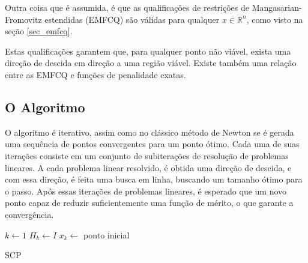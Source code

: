 Outra coisa que é assumida, é que as qualificações de restrições de Mangasarian-Fromovitz estendidas (EMFCQ)
\cite{di1994exact} são válidas para qualquer \( x \in \mathbb{R}^n \), como visto na seção \ref{sec_emfcq}.

%
Estas qualificações garantem que, para qualquer ponto não viável, exista uma
direção de descida em direção a uma região viável. Existe também uma relação entre as EMFCQ
e funções de penalidade exatas.


\subsection{O Algoritmo}
O algoritmo é iterativo, assim como no clássico método de Newton se é gerada
uma sequência de pontos convergentes para um ponto ótimo.
Cada uma de suas iterações consiste em um conjunto de subiterações de
resolução de problemas lineares. A cada problema linear resolvido, é obtida
uma direção de descida, e com essa direção, é feita uma busca em linha,
buscando um tamanho ótimo para o passo. Após essas iterações de problemas
lineares, é esperado que um novo ponto capaz de reduzir suficientemente uma
função de mérito, o que garante a convergência.



\begin{algorithm}[H]
  \SetAlgoLined
  \( k \gets 1 \)\;
  \( H_k \gets I \)\;
  \( x_k \gets \) ponto inicial\;
  
  \caption{SCP}
\end{algorithm}
\vspace{15pt}



